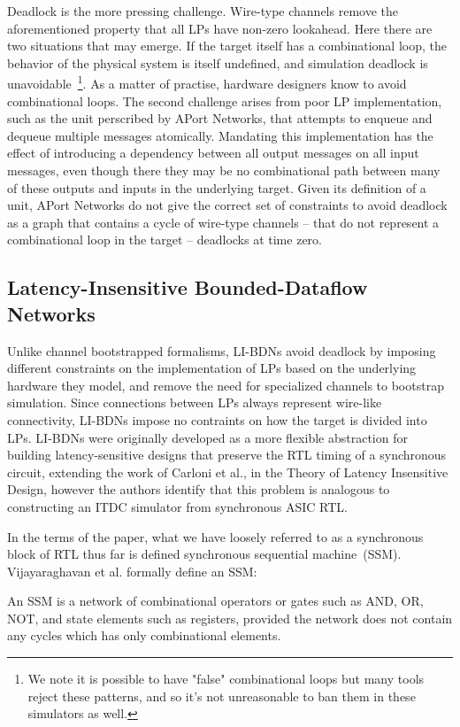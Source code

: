 Deadlock is the more pressing challenge. Wire-type channels remove the
aforementioned property that all LPs have non-zero lookahead.  Here there are
two situations that may emerge. If the target itself has a combinational loop,
the behavior of the physical system is itself undefined, and simulation
deadlock is unavoidable~\footnote{We note it is possible to have "false"
combinational loops but many tools reject these patterns, and so it's not
unreasonable to ban them in these simulators as well.}. As a matter of
practise, hardware designers know to avoid combinational loops. The second
challenge arises from poor LP implementation, such as the unit perscribed by
APort Networks, that attempts to enqueue and dequeue multiple messages
atomically. Mandating this implementation has the effect of introducing a
dependency between all output messages on all input messages, even though there
they may be no combinational path between many of these outputs and inputs in
the underlying target. Given its definition of a unit, APort Networks do not
give the correct set of constraints to avoid deadlock as a graph that contains
a cycle of wire-type channels -- that do not represent a combinational loop in
the target -- deadlocks at time zero.


\subsection{Latency-Insensitive Bounded-Dataflow Networks}

Unlike channel bootstrapped formalisms, LI-BDNs avoid deadlock by imposing
different constraints on the implementation of LPs based on the underlying
hardware they model, and remove the need for specialized channels to bootstrap
simulation. Since connections between LPs always represent wire-like
connectivity, LI-BDNs impose no contraints on how the target
is divided into LPs. LI-BDNs were originally developed as a more flexible abstraction for building
latency-sensitive designs that preserve the RTL timing of a synchronous circuit, extending
the work of Carloni et al., in the Theory of Latency Insensitive Design, however the authors identify that this problem is analogous
to constructing an ITDC simulator from synchronous ASIC RTL.

In the terms of the paper, what we have loosely referred to as a synchronous
block of RTL thus far is defined synchronous sequential machine~(SSM). Vijayaraghavan et
al.\cite{LIBDN} formally define an SSM:

\begin{widequote}
An SSM is a network of combinational operators or gates
such as AND, OR, NOT, and state elements such as registers,
provided the network does not contain any cycles which has
only combinational elements.
\end{widequote}

